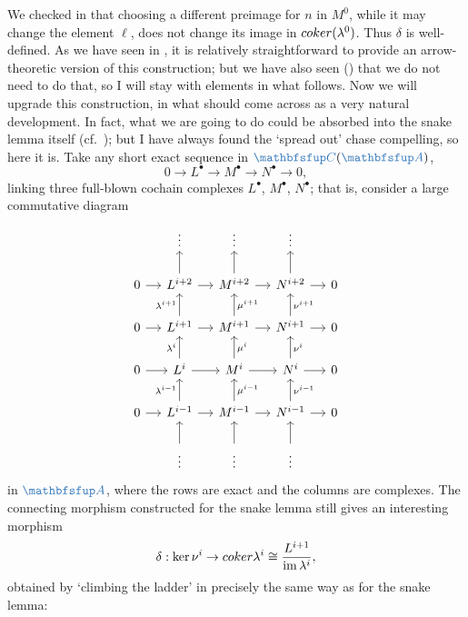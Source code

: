 We checked in  that
choosing a different preimage for $n$ in $M^0$, while it may change
the element $\ell$, does not change its image in
$coker(\lambda^0)$. Thus $\delta$ is well-defined. As we have seen in
, it is relatively
straightforward to provide an arrow-theoretic version of this
construction; but we have also seen () that we do not
need to do that, so I will stay with elements in what follows.  Now we
will upgrade this construction, in what should come across as a very
natural development. In fact, what we are going to do could be
absorbed into the snake lemma itself (cf.\
); but I have
always found the `spread out' chase compelling, so here it is.  Take
any short exact sequence in $\categ{C}(\categ{A})$,
\[
  0 \longrightarrow L^\bullet \longrightarrow M^\bullet
  \longrightarrow N^\bullet \longrightarrow 0,
\]
linking three full-blown cochain complexes $L^\bullet$, $M^\bullet$,
$N^\bullet$; that is, consider a large commutative diagram
\[\begin{tikzcd}[column sep=small]
    & \vdots & \vdots & \vdots & \\
    0 \arrow[r] & L^{i+2} \arrow[r] \arrow[u] & M^{i+2} \arrow[r]
    \arrow[u] &
    N^{i+2} \arrow[r] \arrow[u] & 0 \\
    0 \arrow[r] & L^{i+1} \arrow[r] \arrow[u, "\lambda^{i+1}"] &
    M^{i+1} \arrow[r] \arrow[u, "\mu^{i+1}"'] &
    N^{i+1} \arrow[r] \arrow[u, "\nu^{i+1}"'] & 0 \\
    0 \arrow[r] & L^i \arrow[r] \arrow[u, "\lambda^i"] & M^i \arrow[r]
    \arrow[u, "\mu^i"'] &
    N^i \arrow[r] \arrow[u, "\nu^i"'] & 0 \\
    0 \arrow[r] & L^{i-1} \arrow[r] \arrow[u, "\lambda^{i-1}"] &
    M^{i-1} \arrow[r] \arrow[u, "\mu^{i-1}"'] &
    N^{i-1} \arrow[r] \arrow[u, "\nu^{i-1}"'] & 0 \\
    & \vdots \arrow[u] & \vdots \arrow[u] & \vdots \arrow[u] &
  \end{tikzcd}\] in $\categ{A}$, where the rows are exact and the
columns are complexes. The connecting morphism constructed for the
snake lemma still gives an interesting morphism
\[
  \delta : \ker\nu^i \to coker\lambda^i \cong
  \frac{L^{i+1}}{\operatorname{im}\lambda^i},
\]
obtained by `climbing the ladder' in precisely the same way as for the
snake lemma:
